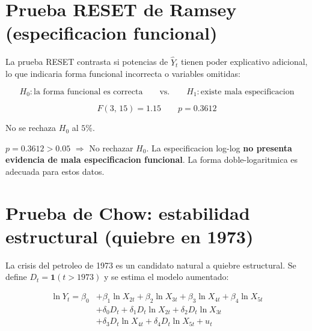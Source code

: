 \documentclass[12pt, letterpaper]{article}
\begin{document}
\section{Prueba RESET de Ramsey (especificacion funcional)}

La prueba RESET contrasta si potencias de $\hat{Y}_t$ tienen poder explicativo
adicional, lo que indicaria forma funcional incorrecta o variables omitidas:

\begin{equation}
  H_0: \text{la forma funcional es correcta}
  \qquad \text{vs.} \qquad
  H_1: \text{existe mala especificacion}
\end{equation}

\begin{equation}
  F(3,\,15) = 1.15 \qquad p = 0.3612
\end{equation}

No se rechaza $H_0$ al $5\%$.

\begin{clave}
  $p = 0.3612 > 0.05$ $\Rightarrow$ No rechazar $H_0$.
  La especificacion log-log \textbf{no presenta evidencia de mala especificacion
  funcional}. La forma doble-logaritmica es adecuada para estos datos.
\end{clave}

\section{Prueba de Chow: estabilidad estructural (quiebre en 1973)}

La crisis del petroleo de 1973 es un candidato natural a quiebre estructural.
Se define $D_t = \mathbf{1}(t > 1973)$ y se estima el modelo aumentado:

\begin{equation}
\begin{split}
  \ln Y_t = \beta_0 & + \beta_1 \ln X_{2t} + \beta_2 \ln X_{3t} + \beta_3 \ln X_{4t} + \beta_4 \ln X_{5t} \\
                    & + \delta_0 D_t + \delta_1 D_t \ln X_{2t} + \delta_2 D_t \ln X_{3t} \\
                    & + \delta_3 D_t \ln X_{4t} + \delta_4 D_t \ln X_{5t} + u_t
\end{split}
\label{eq:chow}
\end{equation}
\end{document}
